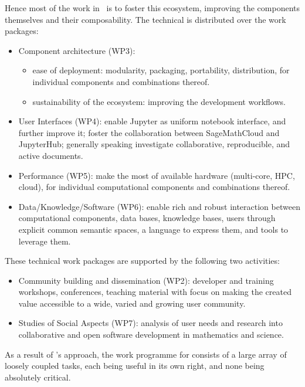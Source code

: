 \documentclass{deliverablereport}
\begin{document}
Hence most of the work in \ODK\ is to foster this ecosystem, improving
the components themselves and their composability. The technical is
distributed over the work packages:
\begin{itemize}
\item Component architecture (WP3):
  \begin{itemize}
  \item ease of deployment: modularity, packaging, portability,
    distribution, for individual components and combinations thereof.
  \item sustainability of the ecosystem: improving the development workflows.
  \end{itemize}
\item User Interfaces (WP4): enable Jupyter as uniform notebook
  interface, and further improve it; foster the collaboration between
  SageMathCloud and JupyterHub; generally speaking investigate
  collaborative, reproducible, and active documents.
\item Performance (WP5): make the most of available hardware
  (multi-core, HPC, cloud), for individual computational components and
  combinations thereof.
\item Data/Knowledge/Software (WP6): enable rich and robust
  interaction between computational components, data bases, knowledge
  bases, users through explicit common semantic spaces, a language to
  express them, and tools to leverage them.
\end{itemize}
These technical work packages are supported by the following two activities:
\begin{itemize}
\item Community building and dissemination (WP2): developer and
  training workshops, conferences, teaching material with focus on
  making the created value accessible to a wide, varied and growing user community.
\item Studies of Social Aspects (WP7): analysis of user needs and
  research into collaborative and open software development in
  mathematics and science.
\end{itemize}

As a result of \ODK's approach, the work programme for \ODK consists
of a large array of loosely coupled tasks, each being useful in its
own right, and none being absolutely critical.
\end{document}
